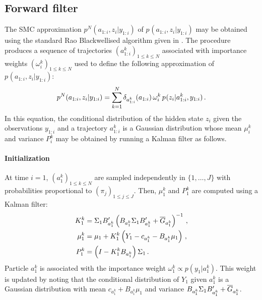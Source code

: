 \subsection{Forward filter}
\label{sec:forward}
The SMC approximation $p^N_{}(a_{1:i},z_{i}|y_{1:i})$ of $p_{}(a_{1:i},z_{i}|y_{1:i})$ may be obtained using the standard Rao Blackwellised  algorithm given in \cite{chen:liu:2000}. The procedure produces a sequence of trajectories $(a^k_{1:i})_{1\le k \le N}$ associated with importance weights $(\omega^k_{i})_{1\le k \le N}$ used to define the following approximation of $p_{}(a_{1:i},z_{i}|y_{1:i})$:
\[
p^N_{}(a_{1:i},z_{i}|y_{1:i}) = \sum_{k=1}^N\delta_{a^k_{1:i}}(a_{1:i})\,\omega^k_{i}\,p_{}(z_{i}|a^k_{1:i},y_{1:i})\,.
\]
In this equation, the conditional distribution of the hidden state $z_{i}$ given the observations $y_{1:i}$ and a trajectory $a^k_{1:i}$ is a Gaussian distribution whose mean $\mu^k_{i}$ and variance $P^k_{i}$ may be obtained by running a Kalman filter as follows. 
\paragraph{Initialization}
At time $i=1$, $(a^k_1)_{1\le k \le N}$ are sampled independently in $\{1,\ldots,J\}$ with probabilities proportional to $(\pi_j)_{1\le j\le J}$. Then, $\mu_1^k$ and $P_1^k$ are computed using a Kalman filter:
\begin{align*}
K^k_{1} &=\Sigma_1B'_{a_1^k}\left(B_{a_1^k}\Sigma_1B'_{a_1^k} + \overline{G}_{a_1^k}\right)^{-1}\,,\\
\mu^k_{1} &= \mu_{1} + K^k_1\left(Y_1 - c_{a_{1}^k} - B_{a_1^k}\mu_{1}\right)\,,\\
P^k_{1} &=\left(I-K^k_{1}B_{a_1^k}\right)\Sigma_1\,.
\end{align*}
Particle $a_1^k$ is associated with the importance weight $\omega^k_1 \propto p(y_1|a_1^k)$. This weight is updated by noting that the conditional distribution of $Y_1$ given $a_1^k$ is a Gaussian distribution with mean $c_{a^k_1}+B_{a^k_1}\mu_1$ and variance $B_{a^k_1}\Sigma_1B'_{a^k_1} + \overline{G}_{a^k_1}$. 
